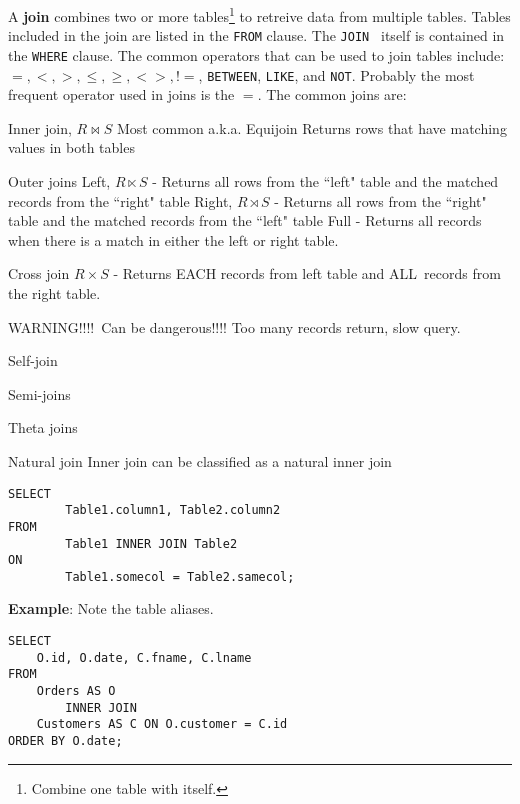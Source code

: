 \documentclass{article}
\begin{document}
 A \textbf{join} combines two or more tables\footnote{Combine one table with itself.} to retreive data from multiple tables.  Tables included in the join are listed in the \texttt{FROM} clause.  The \texttt{JOIN } itself is contained in the \texttt{WHERE} clause.  The common operators that can be used to join tables include: $=, <, >, \le, \ge, <>, !=$, \texttt{BETWEEN}, \texttt{LIKE}, and \texttt{NOT}.  Probably the most frequent operator used in joins is the $=$.  The common joins are:

 
 
\begin{outline}[enumerate]
        \1 Inner join, $R \bowtie S$
                \2 Most common
                \2 a.k.a. Equijoin
                \2 Returns rows that have matching values in both tables
                
         \1 Outer joins
                \2 Left,  $R \ltimes S$ - Returns all rows from the ``left" table and the matched records from the ``right" table
                \2 Right,  $R \rtimes S$  - Returns all rows from the ``right"
table and the matched records from the ``left" table
                \2 Full  - Returns all records when there is a match in either the left or right table.  %
                
         \1 Cross join $R \times S$ - Returns EACH records from left table and ALL\ records from the right table.  
 
         \2 WARNING!!!!\ Can be dangerous!!!! 
Too many records return, slow query. 

\1 Self-join

\1 Semi-joins

\1 Theta joins

\1 Natural join
        \2 Inner join can be classified as a natural inner join


 \end{outline}
  
  
  
  
  
  
\begin{lstlisting}[frame=single]  
SELECT 
        Table1.column1, Table2.column2 
FROM 
        Table1 INNER JOIN Table2
ON 
        Table1.somecol = Table2.samecol;
\end{lstlisting} 
%
%      
  \textbf{Example}: Note the table aliases.          
                

\begin{lstlisting}[frame=single]  
SELECT 
    O.id, O.date, C.fname, C.lname
FROM
    Orders AS O
        INNER JOIN
    Customers AS C ON O.customer = C.id
ORDER BY O.date; 
\end{lstlisting} 
%
%              
\end{document}
